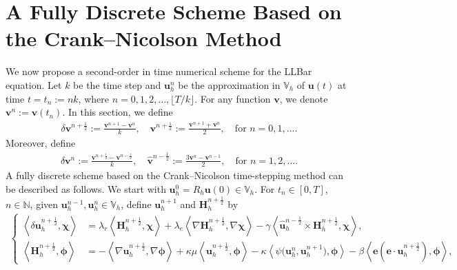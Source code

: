 \documentclass[11pt, reqno]{amsart}
\theoremstyle{definition}
\theoremstyle{remark}
\numberwithin{equation}{section}
\newcommand{\bff}{\boldsymbol}
\newcommand{\bb}{\mathbb}
\newcommand{\dt}{\mathrm{d}t}
\newcommand{\norm}[2]{\left\|{#1}\right\|_{#2}}
\newcommand{\inpro}[2]{\left\langle#1,#2\right\rangle}
\begin{document}
\section{A Fully Discrete Scheme Based on the Crank--Nicolson Method}\label{sec:Crank}

We now propose a second-order in time numerical scheme for the LLBar equation. Let $k$ be the time step and $\bff{u}_h^n$ be the approximation in $\bb{V}_h$ of $\bff{u}(t)$ at time $t=t_n:=nk$, where $n=0,1,2,\ldots, \lfloor T/k \rfloor$. 
For any function $\bff{v}$, we denote $\bff{v}^n:= \bff{v}(t_n)$. In this section, we define
\begin{align*}
\delta \bff{v}^{n+\frac{1}{2}} :=
\frac{\bff{v}^{n+1}-\bff{v}^{n}}{k}, 
\quad 
\bff{v}^{n+\frac{1}{2}}:=
\frac{\bff{v}^{n+1}+\bff{v}^n}{2},
\quad 
\text{for } n=0,1,\ldots.
\end{align*}
Moreover, define
\begin{align}\label{equ:v n min half}
\delta \bff{v}^n :=
\frac{\bff{v}^{n+\frac{1}{2}} - \bff{v}^{n-\frac{1}{2}}}{k},
\quad
\widehat{\bff{v}}^{n-\frac{1}{2}}
:=
\frac{3\bff{v}^n-\bff{v}^{n-1}}{2},
\quad
\text{for } n=1,2,\ldots.
\end{align}
A fully discrete scheme based on the Crank--Nicolson time-stepping method can be described as follows. We start with $\bff{u}_h^0= R_h \bff{u}(0) \in \bb{V}_h$. For $t_n\in [0,T]$, $n\in \bb{N}$, given $\bff{u}_h^{n-1}, \bff{u}_h^n \in \bb{V}_h$, define $\bff{u}_h^{n+1}$ and $\bff{H}_h^{n+\frac{1}{2}}$ by
\begin{align}\label{equ:cranknic}
	\left\{
	\begin{alignedat}{1}
		\inpro{\delta \bff{u}_h^{n+\frac{1}{2}}}{\bff{\chi}}
		&=
		\lambda_r \inpro{\bff{H}_h^{n+\frac{1}{2}}}{\bff{\chi}}
		+
		\lambda_e \inpro{\nabla \bff{H}_h^{n+\frac{1}{2}}}{\nabla \bff{\chi}}
		-
		\gamma \inpro{\widehat{\bff{u}}_h^{n-\frac{1}{2}} \times \bff{H}_h^{n+\frac{1}{2}}}{\bff{\chi}},
		\\
		\inpro{\bff{H}_h^{n+\frac{1}{2}}}{\bff{\phi}} 
		&=
		-
		\inpro{\nabla \bff{u}_h^{n+\frac{1}{2}}}{\nabla \bff{\phi}}
		+
		\kappa \mu \inpro{\bff{u}_h^{n+\frac{1}{2}}}{\bff{\phi}}
		-
		\kappa \inpro{\psi \big(\bff{u}_h^n, \bff{u}_h^{n+1}\big)}{\bff{\phi}}
		-
		\beta \inpro{\bff{e}(\bff{e}\cdot \bff{u}_h^{n+\frac12})}{\bff{\phi}},
	\end{alignedat}
	\right.
\end{align}
\end{document}
